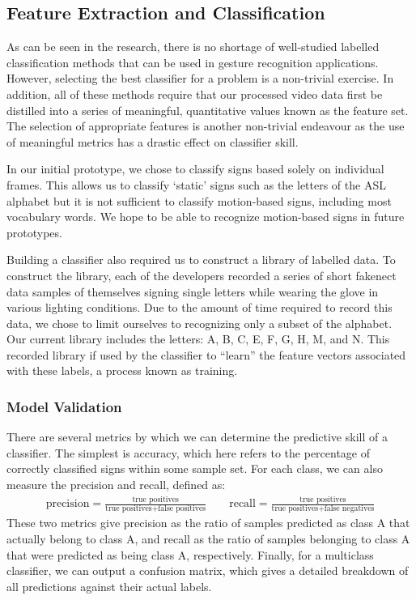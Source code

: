 \documentclass[12pt]{article}
\begin{document}
\subsection{Feature Extraction and Classification}
As can be seen in the research, there is no shortage of well-studied labelled classification methods that can be used in gesture recognition applications. However, selecting the best classifier for a problem is a non-trivial exercise. In addition, all of these methods require that our processed video data first be distilled into a series of meaningful, quantitative values known as the feature set. The selection of appropriate features is another non-trivial endeavour as the use of meaningful metrics has a drastic effect on classifier skill.

In our initial prototype, we chose to classify signs based solely on individual frames. This allows us to classify ‘static’ signs such as the letters of the ASL alphabet but it is not sufficient to classify motion-based signs, including most vocabulary words. We hope to be able to recognize motion-based signs in future prototypes. 

Building a classifier also required us to construct a library of labelled data. To construct the library, each of the developers recorded a series of short fakenect data samples of themselves signing single letters while wearing the glove in various lighting conditions. Due to the amount of time required to record this data, we chose to limit ourselves to recognizing only a subset of the alphabet. Our current library includes the letters: A, B, C, E, F, G, H, M, and N. This recorded library if used by the classifier to “learn” the feature vectors associated with these labels, a process known as training.  

\subsubsection{Model Validation}
There are several metrics by which we can determine the predictive skill of a classifier. The simplest is accuracy, which here refers to the percentage of correctly classified signs within some sample set. For each class, we can also measure the precision and recall, defined as:
\begin{gather*}
\text{precision} = \frac {\text{true positives}} {\text{true positives} + \text{false positives}} 
\quad \quad
\text{recall} = \frac {\text{true positives}} {\text{true positives} + \text{false negatives}}
\end{gather*}
These two metrics give precision as the ratio of samples predicted as class A that actually belong to class A, and recall as the ratio of samples belonging to class A that were predicted as being class A, respectively. Finally, for a multiclass classifier, we can output a confusion matrix, which gives a detailed breakdown of all predictions against their actual labels. 
\end{document}
